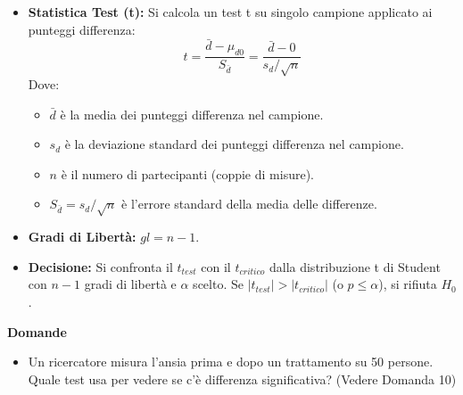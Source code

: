 \documentclass[12pt, a4paper]{article}
\newenvironment{reflectionbox}{%
    \medskip
    \begin{framed}\par\noindent
    \textbf{\color{boxtitlecolor}Domande} \par
    \begin{itemize}[leftmargin=*, label=$\blacktriangleright$]
}{%
    \end{itemize}\par
    \end{framed}
    \medskip
}
\newcommand{\alphaerr}{\alpha} %
\newcommand{\Hnull}{H_0} %
\newcommand{\df}{gl} %
\begin{document}
\begin{itemize}
    \item \textbf{Statistica Test (t):} Si calcola un test t su singolo campione applicato ai punteggi differenza:
        $$ t = \frac{\bar{d} - \mu_{d0}}{S_{\bar{d}}} = \frac{\bar{d} - 0}{s_d / \sqrt{n}} $$
        Dove:
        \begin{itemize}
            \item $\bar{d}$ è la media dei punteggi differenza nel campione.
            \item $s_d$ è la deviazione standard dei punteggi differenza nel campione.
            \item $n$ è il numero di partecipanti (coppie di misure).
            \item $S_{\bar{d}} = s_d / \sqrt{n}$ è l'errore standard della media delle differenze.
        \end{itemize}
    \item \textbf{Gradi di Libertà:} $\df = n - 1$.
    \item \textbf{Decisione:} Si confronta il $t_{test}$ con il $t_{critico}$ dalla distribuzione t di Student con $n-1$ gradi di libertà e $\alphaerr$ scelto. Se $|t_{test}| > |t_{critico}|$ (o $p \le \alphaerr$), si rifiuta $\Hnull$.
\end{itemize}

\begin{reflectionbox}
    \item Un ricercatore misura l'ansia prima e dopo un trattamento su 50 persone. Quale test usa per vedere se c'è differenza significativa? (Vedere Domanda 10)
\end{reflectionbox}
\end{document}
